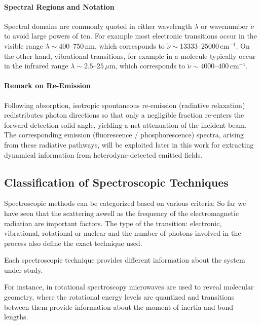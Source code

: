 \paragraph{Spectral Regions and Notation}
\noindent Spectral domains are commonly quoted in either wavelength $\lambda$ or wavenumber $\tilde{\nu}$ to avoid large powers of ten.
For example most electronic transitions occur in the visible range $\lambda \sim 400$--$750\,\mathrm{nm}$, which corresponds to $\tilde{\nu} \sim 13333$--$25000\,\mathrm{cm}^{-1}$. On the other hand, vibrational transitions, for example in a molecule typically occur in the infrared range $\lambda \sim 2.5$--$25\,\mu\mathrm{m}$, which corresponds to $\tilde{\nu} \sim 4000$--$400\,\mathrm{cm}^{-1}$.

\paragraph{Remark on Re-Emission}
\noindent Following absorption, isotropic spontaneous re-emission (radiative relaxation) redistributes photon directions so that only a negligible fraction re-enters the forward detection solid angle, yielding a net attenuation of the incident beam. The corresponding emission (fluorescence / phosphorescence) spectra, arising from these radiative pathways, will be exploited later in this work for extracting dynamical information from heterodyne-detected emitted fields.

\subsection{Classification of Spectroscopic Techniques}
\label{subsec:spectroscopy_classification}

\noindent Spectroscopic methods can be categorized based on various criteria:
So far we have seen that the scattering aswell as the frequency of the electromagnetic radiation are important factors. The type of the transition: electronic, vibrational, rotational or nuclear and the number of photons involved in the process also define the exact technique used.

\noindent Each spectroscopic technique provides different information about the system under study.

For instance, in rotational spectroscopy microwaves are used to reveal molecular geometry, where the rotational energy levels are quantized and transitions between them provide information about the moment of inertia and bond lengths.

